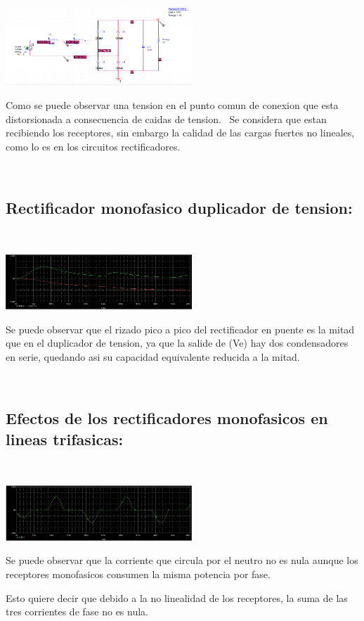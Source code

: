 \documentclass[12pt,letterpaper]{article}
\begin{document}
\includegraphics[width=7cm]{Circuito 1-3-2.png} 
\


Como se puede observar una tension en el punto comun de conexion que esta distorsionada a consecuencia de caidas de tension.
\
Se considera que estan recibiendo los receptores, sin embargo la calidad de las cargas fuertes no lineales, como lo es en los circuitos rectificadores.

\

\subsection{Rectificador monofasico duplicador de tension:}
\

\includegraphics[width=7cm]{Resultado Circuito 1-4.png}
\

Se puede observar que el rizado pico a pico del rectificador en puente es la mitad que en el duplicador de tension, ya que la salide de (Ve) hay dos condensadores en serie, quedando asi su capacidad equivalente reducida a la mitad.
\

\

\subsection{Efectos de los rectificadores monofasicos en lineas trifasicas:}
\

\includegraphics[width=7cm]{Resultado Circuito 1-5.png} 
\


Se puede observar que la corriente que circula por el neutro no es nula aunque los receptores monofasicos consumen la misma potencia por fase.
\

Esto quiere decir que debido a la no linealidad de los receptores, la suma de las tres corrientes de fase no es nula.
\end{document}
